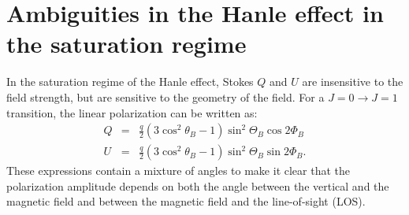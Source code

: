 \documentclass[12pt]{article}
\begin{document}
\section{Ambiguities in the Hanle effect in the saturation regime}
\label{sec:ambiguities}
In the saturation regime of the Hanle effect, Stokes $Q$ and $U$ are insensitive to the field
strength, but are sensitive to the geometry of the field. For a $J=0 \to J=1$ transition, the linear
polarization can be written as:
\begin{eqnarray}
Q &=& \frac{q}{2} \left( 3 \cos^2 \theta_B-1 \right) \sin^2\Theta_B \cos 2\Phi_B \nonumber \\
U &=& \frac{q}{2} \left( 3 \cos^2 \theta_B-1 \right) \sin^2\Theta_B \sin 2\Phi_B.
\end{eqnarray}
These expressions contain a mixture of angles to make it clear that the polarization amplitude
depends on both the angle between the vertical and the magnetic field and between the magnetic
field and the line-of-sight (LOS).
\end{document}
